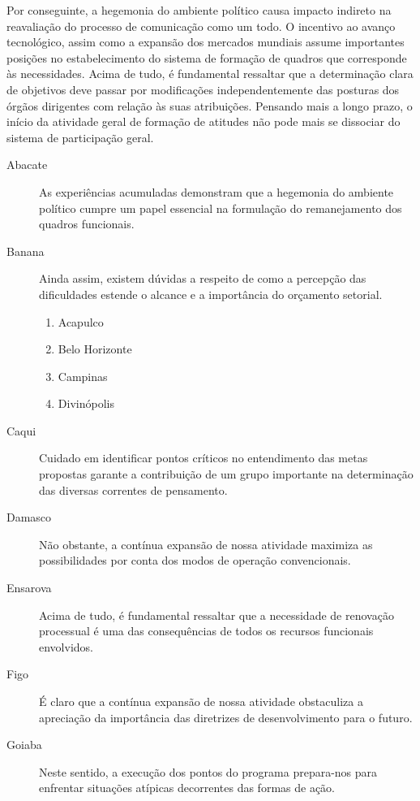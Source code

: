 \documentclass[fleqn]{icat-ufal}
\begin{document}
Por conseguinte, a hegemonia do ambiente político causa impacto indireto na
reavaliação do processo de comunicação como um todo. O incentivo ao avanço
tecnológico, assim como a expansão dos mercados mundiais assume importantes
posições no estabelecimento do sistema de formação de quadros que corresponde às
necessidades. Acima de tudo, é fundamental ressaltar que a determinação clara de
objetivos deve passar por modificações independentemente das posturas dos órgãos
dirigentes com relação às suas atribuições. Pensando mais a longo prazo, o
início da atividade geral de formação de atitudes não pode mais se dissociar do
sistema de participação geral. 

\begin{description}
    
    \item[Abacate] As experiências acumuladas demonstram que a hegemonia do ambiente político
    cumpre um papel essencial na formulação do remanejamento dos quadros funcionais.
    
    \item[Banana] Ainda assim, existem dúvidas a respeito de como a percepção das
    dificuldades estende o alcance e a importância do orçamento setorial.
    \begin{enumerate}
        \item Acapulco
        \item Belo Horizonte
        \item Campinas
        \item Divinópolis
    \end{enumerate}
        
    \item[Caqui] Cuidado em identificar pontos críticos no entendimento das metas
    propostas garante a contribuição de um grupo importante na determinação das
    diversas correntes de pensamento.
    
    \item[Damasco] Não obstante, a contínua expansão de nossa atividade maximiza as
    possibilidades por conta dos modos de operação convencionais.
    
    \item[Ensarova] Acima de tudo, é fundamental ressaltar que a necessidade de renovação
    processual é uma das consequências de todos os recursos funcionais envolvidos.
    
    \item[Figo] É claro que a contínua expansão de nossa atividade obstaculiza a apreciação
    da importância das diretrizes de desenvolvimento para o futuro.
    
    \item[Goiaba] Neste sentido, a execução dos pontos do programa prepara-nos para enfrentar
    situações atípicas decorrentes das formas de ação. 
    
\end{description}
\end{document}
